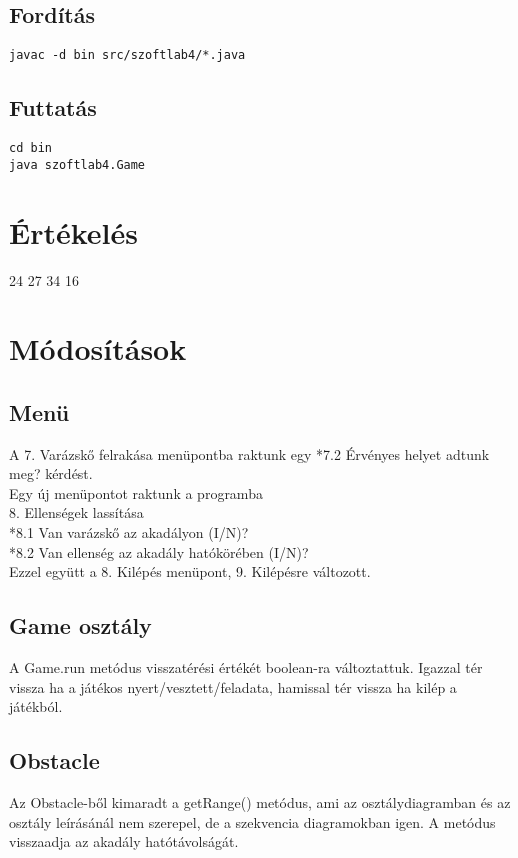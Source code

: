 \subsection{Fordítás}

\lstset{escapeinside=`', xleftmargin=10pt, frame=single, basicstyle=\ttfamily\footnotesize, language=sh}
\begin{lstlisting}
javac -d bin src/szoftlab4/*.java
\end{lstlisting}

\subsection{Futtatás}

\lstset{escapeinside=`', xleftmargin=10pt, frame=single, basicstyle=\ttfamily\footnotesize, language=sh}
\begin{lstlisting}
cd bin
java szoftlab4.Game
\end{lstlisting}

\section{Értékelés}

\begin{ertekeles}
{24}        %
{27}
{34}
{16}
\end{ertekeles}

\section{Módosítások}
\subsection{Menü}
A 7. Varázskő felrakása menüpontba raktunk egy *7.2 Érvényes helyet adtunk meg? kérdést. \\
Egy új menüpontot raktunk a programba \\
8. Ellenségek lassítása \\
*8.1 Van varázskő az akadályon (I/N)? \\
*8.2 Van ellenség az akadály hatókörében (I/N)? \\
Ezzel együtt a 8. Kilépés menüpont, 9. Kilépésre változott. \\

\subsection{Game osztály}
A Game.run metódus visszatérési értékét boolean-ra változtattuk. Igazzal tér vissza ha a játékos nyert/vesztett/feladata, hamissal tér vissza ha kilép a játékból.

\subsection{Obstacle}
Az Obstacle-ből kimaradt a getRange() metódus, ami az osztálydiagramban és az osztály leírásánál nem szerepel, de a szekvencia diagramokban igen. A metódus visszaadja az akadály hatótávolságát.
